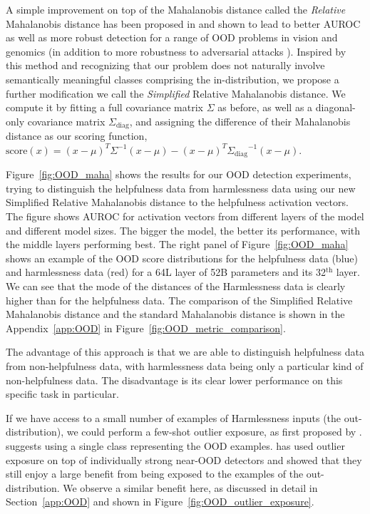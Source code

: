 A simple improvement on top of the Mahalanobis distance called the \textit{Relative} Mahalanobis distance has been proposed in \cite{ren2021simple} and shown to lead to better AUROC as well as more robust detection for a range of OOD problems in vision and genomics (in addition to more robustness to adversarial attacks \cite{fort2022adversarial}). Inspired by this method and recognizing that our problem does not naturally involve semantically meaningful classes comprising the in-distribution, we propose a further modification we call the \textit{Simplified} Relative Mahalanobis distance. We compute it by fitting a full covariance matrix $\Sigma$ as before, as well as a diagonal-only covariance matrix $\Sigma_\mathrm{diag}$, and assigning the difference of their Mahalanobis distance as our scoring function, $\mathrm{score}(x) = (x-\mu)^T\Sigma^{-1}(x-\mu) - (x-\mu)^T{\Sigma_\mathrm{diag}}^{-1}(x-\mu)$.

Figure~\ref{fig:OOD_maha} shows the results for our OOD detection experiments, trying to distinguish the helpfulness data from harmlessness data using our new Simplified Relative Mahalanobis distance to the helpfulness activation vectors. The figure shows AUROC for activation vectors from different layers of the model and different model sizes. The bigger the model, the better its performance, with the middle layers performing best. The right panel of Figure~\ref{fig:OOD_maha} shows an example of the OOD score distributions for the helpfulness data (blue) and harmlessness data (red) for a 64L layer of 52B parameters and its 32${^\mathrm{th}}$ layer. We can see that the mode of the distances of the Harmlessness data is clearly higher than for the helpfulness data.  The comparison of the Simplified Relative Mahalanobis distance and the standard Mahalanobis distance is shown in the Appendix~\ref{app:OOD} in Figure~\ref{fig:OOD_metric_comparison}.

The advantage of this approach is that we are able to distinguish helpfulness data from non-helpfulness data, with harmlessness data being only a particular kind of non-helpfulness data. The disadvantage is its clear lower performance on this specific task in particular. 

If we have access to a small number of examples of Harmlessness inputs (the out-distribution), we could perform a few-shot outlier exposure, as first proposed by \cite{https://doi.org/10.48550/arxiv.1812.04606}. \cite{thulasidasan2021a} suggests using a single class representing the OOD examples. \cite{fort2021exploring} has used outlier exposure on top of individually strong near-OOD detectors and showed that they still enjoy a large benefit from being exposed to the examples of the out-distribution. We observe a similar benefit here, as discussed in detail in Section~\ref{app:OOD} and shown in Figure~\ref{fig:OOD_outlier_exposure}.  

